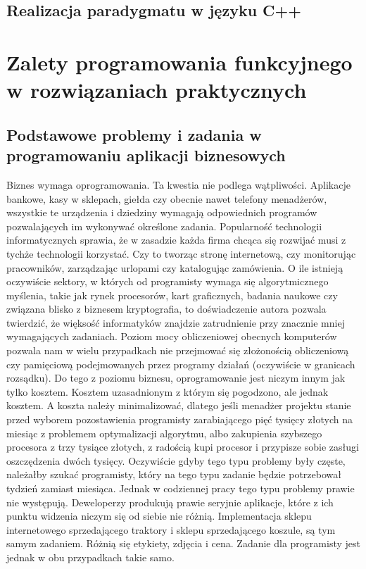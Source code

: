 \documentclass[a4paper,10pt]{report}
\begin{document}
\section{Realizacja paradygmatu w języku C++}
\chapter{Zalety programowania funkcyjnego w rozwiązaniach praktycznych}
\section{Podstawowe problemy i zadania w programowaniu aplikacji biznesowych}
Biznes wymaga oprogramowania. Ta kwestia nie podlega wątpliwości. Aplikacje bankowe, kasy w sklepach, giełda czy obecnie nawet telefony menadżerów, wszystkie te urządzenia i dziedziny wymagają odpowiednich programów pozwalających im wykonywać określone zadania. Popularność technologii informatycznych sprawia, że w zasadzie każda firma chcąca się rozwijać musi z tychże technologii korzystać. Czy to tworząc stronę internetową, czy monitorując pracowników, zarządzając urlopami czy katalogując zamówienia. O ile istnieją oczywiście sektory, w których od programisty wymaga się algorytmicznego myślenia, takie jak rynek procesorów, kart graficznych, badania naukowe czy związana blisko z biznesem kryptografia, to doświadczenie autora pozwala twierdzić, że więksość informatyków znajdzie zatrudnienie przy znacznie mniej wymagających zadaniach. Poziom mocy obliczeniowej obecnych komputerów pozwala nam w wielu przypadkach nie przejmować się złożonością obliczeniową czy pamięciową podejmowanych przez programy działań (oczywiście w granicach rozsądku). Do tego z poziomu biznesu, oprogramowanie jest niczym innym jak tylko kosztem. Kosztem uzasadnionym z którym się pogodzono, ale jednak kosztem. A koszta należy minimalizować, dlatego jeśli menadżer projektu stanie przed wyborem pozostawienia programisty zarabiającego pięć tysięcy złotych na miesiąc z problemem optymalizacji algorytmu, albo zakupienia szybszego procesora z trzy tysiące złotych, z radością kupi procesor i przypisze sobie zasługi oszczędzenia dwóch tysięcy. Oczywiście gdyby tego typu problemy były częste, należałby szukać programisty, który na tego typu zadanie będzie potrzebował tydzień zamiast miesiąca. Jednak w codziennej pracy tego typu problemy prawie nie występują. Deweloperzy produkują prawie seryjnie aplikacje, które z ich punktu widzenia niczym się od siebie nie różnią. Implementacja sklepu internetowego sprzedającego traktory i sklepu sprzedającego koszule, są tym samym zadaniem. Różnią się etykiety, zdjęcia i cena. Zadanie dla programisty jest jednak w obu przypadkach takie samo. 
\end{document}

